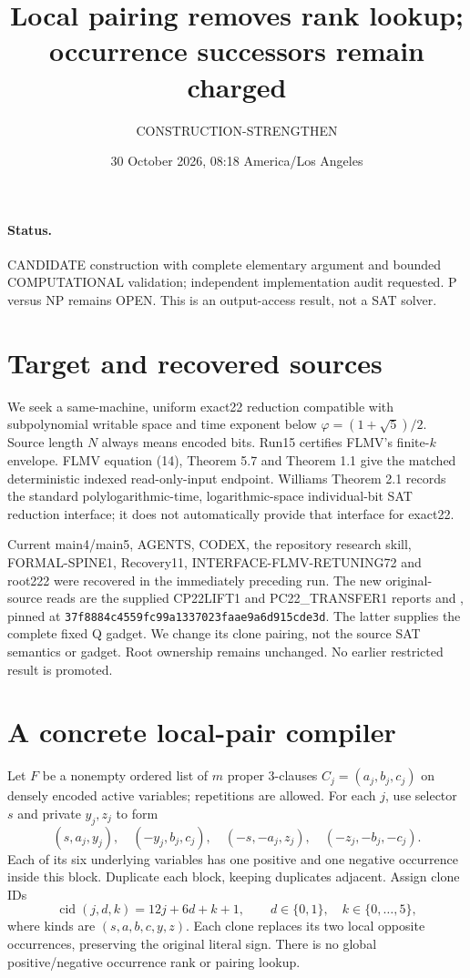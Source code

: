 \documentclass[11pt]{article}
\title{Local pairing removes rank lookup; occurrence successors remain charged}
\author{CONSTRUCTION-STRENGTHEN}\date{30 October 2026, 08:18 America/Los Angeles}
\begin{document}
\maketitle
\paragraph{Status.} CANDIDATE construction with complete elementary argument
and bounded COMPUTATIONAL validation; independent implementation audit requested.
P versus NP remains OPEN. This is an output-access result, not a SAT solver.

\section{Target and recovered sources}
We seek a same-machine, uniform exact22 reduction compatible with
subpolynomial writable space and time exponent below
$\varphi=(1+\sqrt5)/2$. Source length $N$ always means encoded bits.
Run15 certifies FLMV's finite-$k$ envelope. FLMV equation (14),
Theorem 5.7 and Theorem 1.1 give the matched deterministic indexed
read-only-input endpoint. Williams Theorem 2.1 records the standard
polylogarithmic-time, logarithmic-space individual-bit SAT reduction
interface; it does not automatically provide that interface for exact22.

Current main4/main5, AGENTS, CODEX, the repository research skill,
FORMAL-SPINE1, Recovery11, INTERFACE-FLMV-RETUNING72 and root222 were
recovered in the immediately preceding run. The new original-source reads
are the supplied CP22LIFT1 and PC22\_TRANSFER1 reports and
, pinned at
\texttt{37f8884c4559fc99a1337023faae9a6d915cde3d}.
The latter supplies the complete fixed Q gadget. We change its clone pairing,
not the source SAT semantics or gadget.
Root ownership remains unchanged. No earlier restricted result is promoted.

\section{A concrete local-pair compiler}
Let $F$ be a nonempty ordered list of $m$ proper 3-clauses
$C_j=(a_j,b_j,c_j)$ on densely encoded active variables; repetitions are allowed.
For each $j$, use selector $s$ and private $y_j,z_j$ to form
\[
(s,a_j,y_j),\quad(-y_j,b_j,c_j),\quad
(-s,-a_j,z_j),\quad(-z_j,-b_j,-c_j).
\]
Each of its six underlying variables has one positive and one negative
occurrence inside this block. Duplicate each block, keeping duplicates adjacent.
Assign clone IDs
\[
 \operatorname{cid}(j,d,k)=12j+6d+k+1,\qquad
 d\in\{0,1\},\quad k\in\{0,\ldots,5\},
\]
where kinds are $(s,a,b,c,y,z)$. Each clone replaces its two local
opposite occurrences, preserving the original literal sign.
There is no global positive/negative occurrence rank or pairing lookup.
\end{document}
